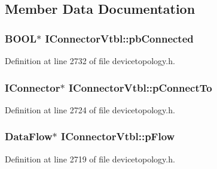 \subsection{Member Data Documentation}
\subsubsection[{\texorpdfstring{pb\+Connected}{pbConnected}}]{ {\bf B\+O\+OL}$\ast$ I\+Connector\+Vtbl\+::pb\+Connected}\hypertarget{struct_i_connector_vtbl_a9a8261edd98f8ee36f8d11ab048645d5}{}\label{struct_i_connector_vtbl_a9a8261edd98f8ee36f8d11ab048645d5}


Definition at line 2732 of file devicetopology.\+h.

\subsubsection[{\texorpdfstring{p\+Connect\+To}{pConnectTo}}]{ {\bf I\+Connector}$\ast$ I\+Connector\+Vtbl\+::p\+Connect\+To}\hypertarget{struct_i_connector_vtbl_a6f8fb12246cdaf9ff105de6281be8d4e}{}\label{struct_i_connector_vtbl_a6f8fb12246cdaf9ff105de6281be8d4e}


Definition at line 2724 of file devicetopology.\+h.

\subsubsection[{\texorpdfstring{p\+Flow}{pFlow}}]{ {\bf Data\+Flow}$\ast$ I\+Connector\+Vtbl\+::p\+Flow}\hypertarget{struct_i_connector_vtbl_aee205b802c0845a8b2153531f815b2c6}{}\label{struct_i_connector_vtbl_aee205b802c0845a8b2153531f815b2c6}


Definition at line 2719 of file devicetopology.\+h.

